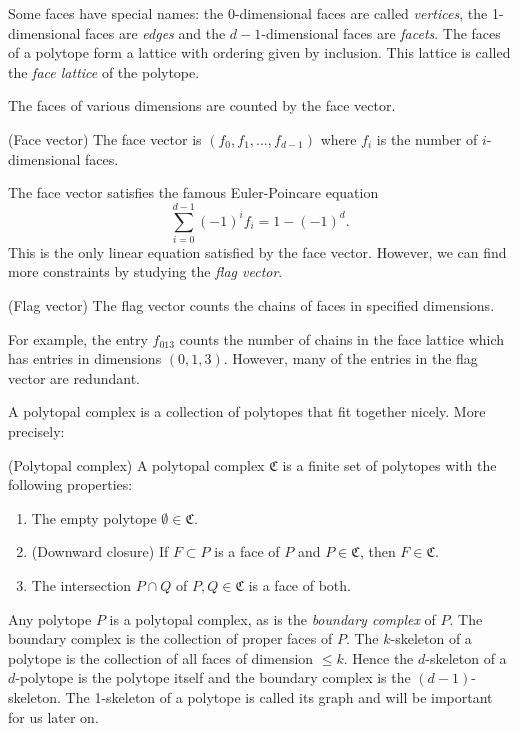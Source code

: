 Some faces have special names: the 0-dimensional faces are called 
\textit{vertices}, the 1-dimensional faces are \textit{edges} and the 
$d-1$-dimensional faces are \textit{facets}.
 The faces of a polytope 
form a lattice with ordering given by inclusion. This lattice is called the 
\textit{face lattice} of the polytope.

The faces of various dimensions 
are counted by the face vector.
\begin{definition}
 (Face vector) The face vector is $(f_0, f_1, \dots, f_{d-1})$ where $f_i$ is 
the number of $i$-dimensional faces.
\end{definition}
The face vector satisfies the famous Euler-Poincare equation
\begin{equation}
 \sum_{i=0}^{d-1} (-1)^i f_i = 1 - (-1)^d.
\end{equation}
This is the only linear equation satisfied by the face vector. However, we can 
find more constraints by studying the \textit{flag vector}.

\begin{definition}
 (Flag vector) The flag vector counts the chains of faces in specified 
dimensions.
\end{definition}

For example, the entry $f_{013}$ counts the number of chains in the face 
lattice which has entries in dimensions $(0,1,3)$. However, many of the entries 
in the flag vector are redundant.

A polytopal complex is a collection of polytopes that fit together nicely.
More precisely:
\begin{definition}
 (Polytopal complex) A polytopal complex $\mathfrak{C}$ is a finite set of 
polytopes with the following properties:
\begin{enumerate}
 \item The empty polytope $\emptyset \in \mathfrak{C}$.
  \item (Downward closure) If $F \subset P$ is a face of $P$ and $P \in 
\mathfrak{C}$, then 
$F \in \mathfrak{C}$.
\item The intersection $P\cap Q$ of $P,Q \in \mathfrak{C}$ is a face of both.

\end{enumerate}

\end{definition}

Any polytope $P$ is a polytopal complex, as is the \textit{boundary complex} of 
$P$. The boundary complex is the collection of proper faces of $P$.
The $k$-skeleton of a polytope is the collection of all faces of dimension $\leq 
k$. Hence the $d$-skeleton of a $d$-polytope is the polytope itself and the 
boundary complex is the $(d-1)$-skeleton. The 1-skeleton of a polytope is called 
its graph and will be important for us later on.

